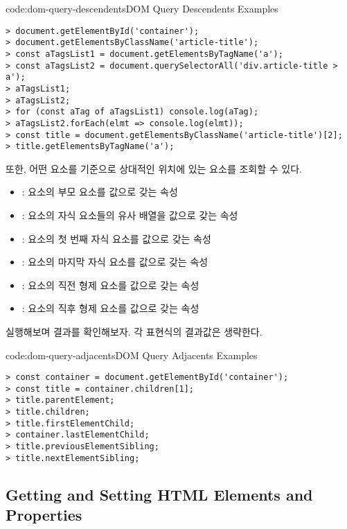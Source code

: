 \begin{codeenv}{code:dom-query-descendents}{DOM Query Descendents Examples}\begin{verbatim}
> document.getElementById('container');
> document.getElementsByClassName('article-title');
> const aTagsList1 = document.getElementsByTagName('a');
> const aTagsList2 = document.querySelectorAll('div.article-title > a');
> aTagsList1;
> aTagsList2;
> for (const aTag of aTagsList1) console.log(aTag);
> aTagsList2.forEach(elmt => console.log(elmt));
> const title = document.getElementsByClassName('article-title')[2];
> title.getElementsByTagName('a');
\end{verbatim}
\end{codeenv}

또한, 어떤 요소를 기준으로 상대적인 위치에 있는 요소를 조회할 수 있다.

\begin{itemize}
    \item {}: 요소의 부모 요소를 값으로 갖는 속성
    \item {}: 요소의 자식 요소들의 유사 배열을 값으로 갖는 속성
    \item {}: 요소의 첫 번째 자식 요소를 값으로 갖는 속성
    \item {}: 요소의 마지막 자식 요소를 값으로 갖는 속성
    \item {}: 요소의 직전 형제 요소를 값으로 갖는 속성
    \item {}: 요소의 직후 형제 요소를 값으로 갖는 속성
\end{itemize}

\를 실행해보며 결과를 확인해보자. 각 표현식의 결과값은 생략한다.

\begin{codeenv}{code:dom-query-adjacents}{DOM Query Adjacents Examples}\begin{verbatim}
> const container = document.getElementById('container');
> const title = container.children[1];
> title.parentElement;
> title.children;
> title.firstElementChild;
> container.lastElementChild;
> title.previousElementSibling;
> title.nextElementSibling;
\end{verbatim}
\end{codeenv}
\clearpage

\subsection*{Getting and Setting HTML Elements and Properties}

